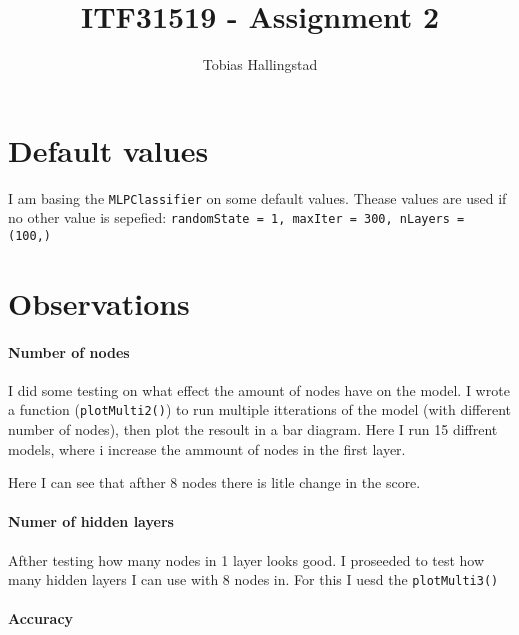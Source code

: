 \documentclass[10pt]{article}
\title{ITF31519 - Assignment 2}
\author{Tobias Hallingstad}
\begin{document}
    \begin{titlepage}
        \maketitle
    \end{titlepage}


    \section{Default values}
    I am basing the \texttt{MLPClassifier} on some default values. Thease values are used if no other value is sepefied: \texttt{randomState = 1, maxIter = 300, nLayers = (100,)}

    \section{Observations}
        \paragraph{Number of nodes}
        I did some testing on what effect the amount of nodes have on the model. I wrote a function (\texttt{plotMulti2()}) to run multiple itterations of the model (with different number of nodes), then plot the resoult in a bar diagram. Here I run 15 diffrent models, where i increase the ammount of nodes in the first layer.


        Here I can see that afther 8 nodes there is litle change in the score.

        \paragraph{Numer of hidden layers}
        Afther testing how many nodes in 1 layer looks good. I proseeded to test how many hidden layers I can use with 8 nodes in. For this I uesd the \texttt{plotMulti3()}


        

        \paragraph{Accuracy}
\end{document}
